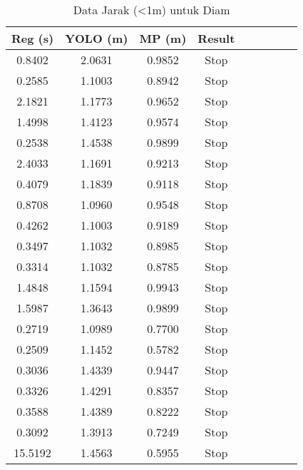 \begin{table}[H]
    \centering
    \caption{Data Jarak (\textless 1m) untuk Diam}
    \label{tab:jarak_diam}
    \begin{tabular}{|c|c|c|c|c|c|c|c|c|}
    \hline
        \cellcolor[HTML]{C0C0C0}Reg (s) & \cellcolor[HTML]{C0C0C0}YOLO (m) & \cellcolor[HTML]{C0C0C0}MP (m) & \cellcolor[HTML]{C0C0C0}Result \\ \hline
        \cellcolor[HTML]{7cFF7c}0.8402 & 2.0631 & 0.9852 & Stop \\ \hline
        \cellcolor[HTML]{7cFF7c}0.2585 & 1.1003 & 0.8942 & Stop \\ \hline
        \cellcolor[HTML]{FF7c7c}2.1821 & 1.1773 & 0.9652 & Stop \\ \hline
        \cellcolor[HTML]{FF7c7c}1.4998 & 1.4123 & 0.9574 & Stop \\ \hline
        \cellcolor[HTML]{7cFF7c}0.2538 & 1.4538 & 0.9899 & Stop \\ \hline
        \cellcolor[HTML]{FF7c7c}2.4033 & 1.1691 & 0.9213 & Stop \\ \hline
        \cellcolor[HTML]{7cFF7c}0.4079 & 1.1839 & 0.9118 & Stop \\ \hline
        \cellcolor[HTML]{7cFF7c}0.8708 & 1.0960 & 0.9548 & Stop \\ \hline
        \cellcolor[HTML]{7cFF7c}0.4262 & 1.1003 & 0.9189 & Stop \\ \hline
        \cellcolor[HTML]{7cFF7c}0.3497 & 1.1032 & 0.8985 & Stop \\ \hline
        \cellcolor[HTML]{7cFF7c}0.3314 & 1.1032 & 0.8785 & Stop \\ \hline
        \cellcolor[HTML]{FF7c7c}1.4848 & 1.1594 & 0.9943 & Stop \\ \hline
        \cellcolor[HTML]{FF7c7c}1.5987 & 1.3643 & 0.9899 & Stop \\ \hline
        \cellcolor[HTML]{7cFF7c}0.2719 & 1.0989 & 0.7700 & Stop \\ \hline
        \cellcolor[HTML]{7cFF7c}0.2509 & 1.1452 & 0.5782 & Stop \\ \hline
        \cellcolor[HTML]{7cFF7c}0.3036 & 1.4339 & 0.9447 & Stop \\ \hline
        \cellcolor[HTML]{7cFF7c}0.3326 & 1.4291 & 0.8357 & Stop \\ \hline
        \cellcolor[HTML]{7cFF7c}0.3588 & 1.4389 & 0.8222 & Stop \\ \hline
        \cellcolor[HTML]{7cFF7c}0.3092 & 1.3913 & 0.7249 & Stop \\ \hline
        \cellcolor[HTML]{FF7c7c}15.5192 & 1.4563 & 0.5955 & Stop \\ \hline
    \end{tabular}
\end{table}

